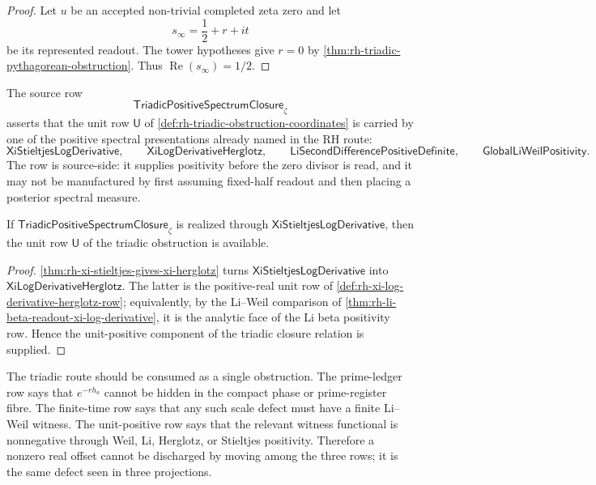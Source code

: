 \begin{proof}
Let $u$ be an accepted non-trivial completed zeta zero and let
$$
s_{\infty}=\frac12+r+it
$$
be its represented readout.  The tower hypotheses give $r=0$ by
\autoref{thm:rh-triadic-pythagorean-obstruction}.  Thus
$\operatorname{Re}(s_{\infty})=1/2$.
\end{proof}

\begin{definition}
\label{def:rh-triadic-positive-spectrum-closure}
The source row
$$
\mathsf{TriadicPositiveSpectrumClosure}_{\zeta}
$$
asserts that the unit row $\mathsf U$ of
\autoref{def:rh-triadic-obstruction-coordinates} is carried by one of
the positive spectral presentations already named in the RH route:
$$
\mathsf{XiStieltjesLogDerivative},
\qquad
\mathsf{XiLogDerivativeHerglotz},
\qquad
\mathsf{LiSecondDifferencePositiveDefinite},
\qquad
\mathsf{GlobalLiWeilPositivity}.
$$
The row is source-side: it supplies positivity before the zero divisor is
read, and it may not be manufactured by first assuming fixed-half
readout and then placing a posterior spectral measure.
\end{definition}

\begin{theorem}
\label{thm:rh-positive-spectrum-supplies-unit-side}
If $\mathsf{TriadicPositiveSpectrumClosure}_{\zeta}$ is realized through
$\mathsf{XiStieltjesLogDerivative}$, then the unit row $\mathsf U$ of
the triadic obstruction is available.
\end{theorem}

\begin{proof}
\autoref{thm:rh-xi-stieltjes-gives-xi-herglotz} turns
$\mathsf{XiStieltjesLogDerivative}$ into
$\mathsf{XiLogDerivativeHerglotz}$.  The latter is the positive-real
unit row of
\autoref{def:rh-xi-log-derivative-herglotz-row}; equivalently, by the
Li--Weil comparison of
\autoref{thm:rh-li-beta-readout-xi-log-derivative}, it is the analytic
face of the Li beta positivity row.  Hence the unit-positive component
of the triadic closure relation is supplied.
\end{proof}

\begin{principle}
\label{prin:rh-three-rows-one-obstruction}
The triadic route should be consumed as a single obstruction.  The
prime-ledger row says that $e^{-rh_a}$ cannot be hidden in the compact
phase or prime-register fibre.  The finite-time row says that any such
scale defect must have a finite Li--Weil witness.  The unit-positive row
says that the relevant witness functional is nonnegative through
Weil, Li, Herglotz, or Stieltjes positivity.  Therefore a nonzero real
offset cannot be discharged by moving among the three rows; it is the
same defect seen in three projections.
\end{principle}

